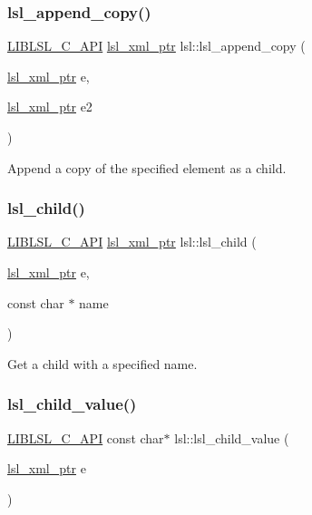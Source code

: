 \subsubsection{\texorpdfstring{lsl\+\_\+append\+\_\+copy()}{lsl\_append\_copy()}}
{\footnotesize\ttfamily \hyperlink{lsl__cpp_8h_aafd0ef1813e8be84a1420c4f1df64615}{L\+I\+B\+L\+S\+L\+\_\+\+C\+\_\+\+A\+PI} \hyperlink{namespacelsl_a5edc7a49a1a1be1634fe6dce3d59c59b}{lsl\+\_\+xml\+\_\+ptr} lsl\+::lsl\+\_\+append\+\_\+copy (\begin{DoxyParamCaption}\item[{\hyperlink{namespacelsl_a5edc7a49a1a1be1634fe6dce3d59c59b}{lsl\+\_\+xml\+\_\+ptr}}]{e,  }\item[{\hyperlink{namespacelsl_a5edc7a49a1a1be1634fe6dce3d59c59b}{lsl\+\_\+xml\+\_\+ptr}}]{e2 }\end{DoxyParamCaption})}

Append a copy of the specified element as a child. \mbox{\label{namespacelsl_a023258f274202055146894d26e3cf2ad}} 
\subsubsection{\texorpdfstring{lsl\+\_\+child()}{lsl\_child()}}
{\footnotesize\ttfamily \hyperlink{lsl__cpp_8h_aafd0ef1813e8be84a1420c4f1df64615}{L\+I\+B\+L\+S\+L\+\_\+\+C\+\_\+\+A\+PI} \hyperlink{namespacelsl_a5edc7a49a1a1be1634fe6dce3d59c59b}{lsl\+\_\+xml\+\_\+ptr} lsl\+::lsl\+\_\+child (\begin{DoxyParamCaption}\item[{\hyperlink{namespacelsl_a5edc7a49a1a1be1634fe6dce3d59c59b}{lsl\+\_\+xml\+\_\+ptr}}]{e,  }\item[{const char $\ast$}]{name }\end{DoxyParamCaption})}

Get a child with a specified name. \mbox{\label{namespacelsl_aa6a774c3c6e431610a98be1b83bc8a3b}} 
\subsubsection{\texorpdfstring{lsl\+\_\+child\+\_\+value()}{lsl\_child\_value()}}
{\footnotesize\ttfamily \hyperlink{lsl__cpp_8h_aafd0ef1813e8be84a1420c4f1df64615}{L\+I\+B\+L\+S\+L\+\_\+\+C\+\_\+\+A\+PI} const char$\ast$ lsl\+::lsl\+\_\+child\+\_\+value (\begin{DoxyParamCaption}\item[{\hyperlink{namespacelsl_a5edc7a49a1a1be1634fe6dce3d59c59b}{lsl\+\_\+xml\+\_\+ptr}}]{e }\end{DoxyParamCaption})}

